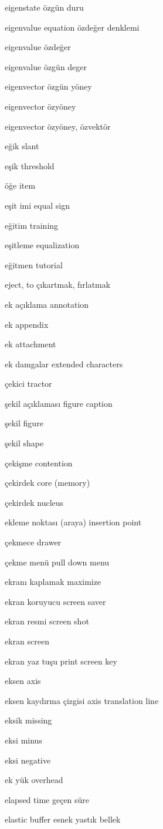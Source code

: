 \documentclass[12pt,fleqn]{article}\usepackage{../../common}
\begin{document}
eigenstate özgün duru

eigenvalue equation özdeğer denklemi

eigenvalue özdeğer

eigenvalue özgün deger

eigenvector özgün yöney

eigenvector özyöney

eigenvector özyöney, özvektör

eğik slant

eşik threshold

öğe item

eşit imi equal sign

eğitim training

eşitleme equalization

eğitmen tutorial

eject, to çıkartmak, fırlatmak

ek açıklama annotation

ek appendix

ek attachment

ek damgalar extended characters

çekici tractor

şekil açıklaması figure caption

şekil figure

şekil shape

çekişme contention

çekirdek core (memory)

çekirdek nucleus

ekleme noktası (araya) insertion point

çekmece drawer

çekme menü pull down menu

ekranı kaplamak maximize

ekran koruyucu screen saver

ekran resmi screen shot

ekran screen

ekran yaz tuşu print screen key

eksen axis

eksen kaydırma çizgisi axis translation line

eksik missing

eksi minus

eksi negative

ek yük overhead

elapsed time geçen süre

elastic buffer esnek yastık bellek
\end{document}
